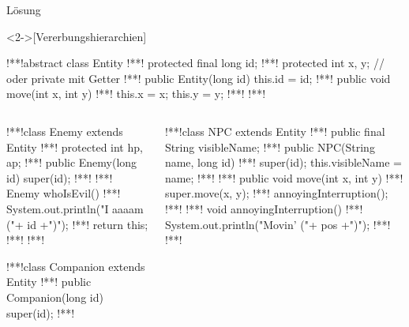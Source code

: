 \begin{frame}[c,fragile]{Lösung}
\begin{solve}<2->[Vererbungshierarchien]
%
\begin{plainjava}[morekeywords={[3]{Entity}},belowskip=0pt,aboveskip=5pt]
!**!abstract class Entity {
!**!   protected final long id;
!**!   protected int x, y; // oder private mit Getter
!**!   public Entity(long id) { this.id = id; }
!**!   public void move(int x, int y) {
!**!      this.x = x; this.y = y;
!**!   }
!**!}
\end{plainjava}
\begin{columns}[c, onlytextwidth]
\begin{column}{.465\linewidth}
\begin{plainjava}[morekeywords={[3]{Enemy,Companion,Entity}},belowskip=0pt,aboveskip=0pt]
!**!class Enemy extends Entity {
!**!   protected int hp, ap;
!**!   public Enemy(long id) { super(id); }
!**!
!**!   Enemy whoIsEvil() {
!**!      System.out.println("I aaaam ("+ id +")");
!**!      return this;
!**!   }
!**!}

!**!class Companion extends Entity {
!**!  public Companion(long id) { super(id); }
!**!}
\end{plainjava}
\end{column}
\begin{column}{.465\linewidth}
\begin{plainjava}[morekeywords={[3]{NPC,Entity}},belowskip=0pt,aboveskip=0pt]
!**!class NPC extends Entity {
!**!   public final String visibleName;
!**!   public NPC(String name, long id) {
!**!      super(id); this.visibleName = name;
!**!   }
!**!   public void move(int x, int y) {
!**!      super.move(x, y);
!**!      annoyingInterruption();
!**!   }
!**!   void annoyingInterruption() {
!**!      System.out.println("Movin' ("+ pos +")");
!**!   }
!**!}
\end{plainjava}
\end{column}
\end{columns}
\end{solve}
\end{frame}

